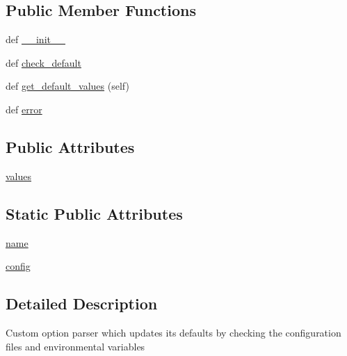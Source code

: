 \subsection*{Public Member Functions}
\begin{DoxyCompactItemize}
\item 
def \hyperlink{classpip_1_1__internal_1_1cli_1_1parser_1_1ConfigOptionParser_a2471a48be2969643aa09d4a50b274040}{\+\_\+\+\_\+init\+\_\+\+\_\+}
\item 
def \hyperlink{classpip_1_1__internal_1_1cli_1_1parser_1_1ConfigOptionParser_abc5709618ebc8da43dfeb29661135e8d}{check\+\_\+default}
\item 
def \hyperlink{classpip_1_1__internal_1_1cli_1_1parser_1_1ConfigOptionParser_a21c21f557924b6bc7d42ac53dd681214}{get\+\_\+default\+\_\+values} (self)
\item 
def \hyperlink{classpip_1_1__internal_1_1cli_1_1parser_1_1ConfigOptionParser_a495438a9d61c309d3a5f6f1720d1eb0f}{error}
\end{DoxyCompactItemize}
\subsection*{Public Attributes}
\begin{DoxyCompactItemize}
\item 
\hyperlink{classpip_1_1__internal_1_1cli_1_1parser_1_1ConfigOptionParser_ace7a0a42524f9997e642af86efc487bf}{values}
\end{DoxyCompactItemize}
\subsection*{Static Public Attributes}
\begin{DoxyCompactItemize}
\item 
\hyperlink{classpip_1_1__internal_1_1cli_1_1parser_1_1ConfigOptionParser_a50077696ec4a329b94ecd6d6415c4d3b}{name}
\item 
\hyperlink{classpip_1_1__internal_1_1cli_1_1parser_1_1ConfigOptionParser_a1cf5a282cc6116237cbf18d56470e7d7}{config}
\end{DoxyCompactItemize}


\subsection{Detailed Description}
\begin{DoxyVerb}Custom option parser which updates its defaults by checking the
configuration files and environmental variables\end{DoxyVerb}
 

